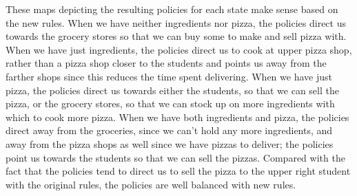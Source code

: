 These maps depicting the resulting policies for each state make sense based on the new rules. When we have neither ingredients nor pizza, the policies direct us towards the grocery stores so that we can buy some to make and sell pizza with. When we have just ingredients, the policies direct us to cook at upper pizza shop, rather than a pizza shop closer to the students and points us away from the farther shops since this reduces the time spent delivering. When we have just pizza, the policies direct us towards either the students, so that we can sell the pizza, or the grocery stores, so that we can stock up on more ingredients with which to cook more pizza. When we have both ingredients and pizza, the policies direct away from the groceries, since we can't hold any more ingredients, and away from the pizza shops as well since we have pizzas to deliver; the policies point us towards the students so that we can sell the pizzas. Compared with the fact that the policies tend to direct us to sell the pizza to the upper right student with the original rules, the policies are well balanced with new rules.